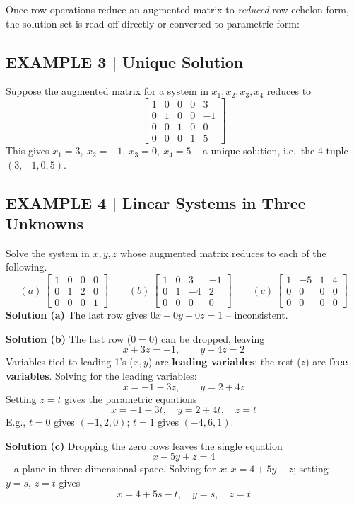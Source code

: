 \documentclass{article}
\theoremstyle{mystyle}
\begin{document}
Once row operations reduce an augmented matrix to \emph{reduced} row echelon form, the solution set is read off directly or converted to parametric form:

\subsection*{EXAMPLE 3 | Unique Solution}
Suppose the augmented matrix for a system in $x_1,x_2,x_3,x_4$ reduces to
\[
\begin{bmatrix}1&0&0&0&3\\0&1&0&0&-1\\0&0&1&0&0\\0&0&0&1&5\end{bmatrix}
\]
This gives $x_1=3,\ x_2=-1,\ x_3=0,\ x_4=5$ -- a unique solution, i.e.\ the 4-tuple $(3,-1,0,5)$.

\subsection*{EXAMPLE 4 | Linear Systems in Three Unknowns}
Solve the system in $x,y,z$ whose augmented matrix reduces to each of the following.
\[
(a)\ \begin{bmatrix}1&0&0&0\\0&1&2&0\\0&0&0&1\end{bmatrix}\qquad
(b)\ \begin{bmatrix}1&0&3&-1\\0&1&-4&2\\0&0&0&0\end{bmatrix}\qquad
(c)\ \begin{bmatrix}1&-5&1&4\\0&0&0&0\\0&0&0&0\end{bmatrix}
\]
\textbf{Solution (a)} The last row gives $0x+0y+0z=1$ -- inconsistent.

\textbf{Solution (b)} The last row ($0=0$) can be dropped, leaving
\[
x+3z=-1,\qquad y-4z=2
\]
Variables tied to leading 1's ($x,y$) are \textbf{leading variables}; the rest ($z$) are \textbf{free variables}. Solving for the leading variables:
\[
x=-1-3z,\qquad y=2+4z
\]
Setting $z=t$ gives the parametric equations
\[
x=-1-3t,\quad y=2+4t,\quad z=t
\]
E.g., $t=0$ gives $(-1,2,0)$; $t=1$ gives $(-4,6,1)$.

\textbf{Solution (c)} Dropping the zero rows leaves the single equation
\[
x-5y+z=4 \tag{1}
\]
-- a plane in three-dimensional space. Solving for $x$: $x=4+5y-z$; setting $y=s,\,z=t$ gives
\[
x=4+5s-t,\quad y=s,\quad z=t \tag{2}
\]
\end{document}
